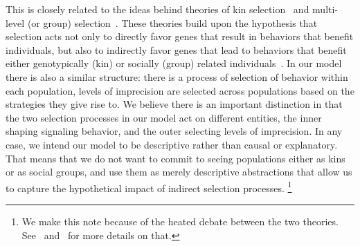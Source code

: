 \documentclass[a4paper]{article}
\begin{document}
This is closely related to the ideas behind theories of kin selection~\parencite{hamilton_genetical_1964} and multi-level (or group) selection~\parencite{wilson_theory_1975}.
These theories build upon the hypothesis that selection acts not only to directly favor genes that result in behaviors that benefit individuals, but also to indirectly favor genes that lead to behaviors that benefit either genotypically (kin) or socially (group) related individuals~\parencite[see][for more details]{okasha_evolution_2006}.
In our model there is also a similar structure: there is a process of selection of behavior within each population, levels of imprecision are selected across populations based on the strategies they give rise to.
We believe there is an important distinction in that the two selection processes in our model act on different entities, the inner shaping signaling behavior, and the outer selecting levels of imprecision.
In any case, we intend our model to be descriptive rather than causal or explanatory.
That means that we do not want to commit to seeing populations either as kins or as social groups, and use them as merely descriptive abstractions that allow us to capture the hypothetical impact of indirect selection processes.%
\footnote{We make this note because of the heated debate between the two theories. See~\textcite{kohn_darwin_2008} and~\textcite{kramer_kin_2016} for more details on that.}%
\end{document}

